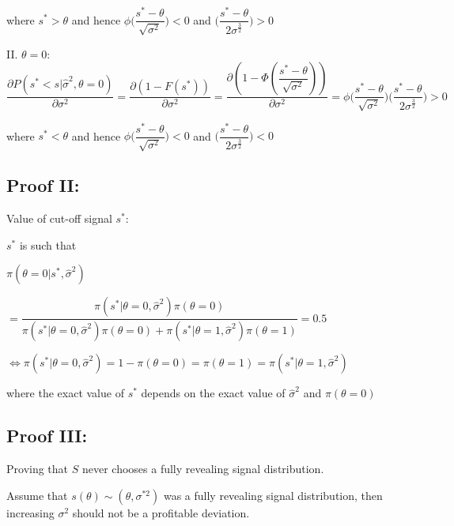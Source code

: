 \documentclass[paper=a4,12pt,DIV=11,twoside=false]{scrartcl}
\begin{document}
where $s^{*}>\theta$ and hence $\phi\Big(\dfrac{s^{*}-\theta}{\sqrt{\sigma^2}}\Big)<0$ and $\Big(\dfrac{s^{*}-\theta}{2\sigma^{\frac{3}{2}}}\Big)>0$

II. $\theta=0$:
\begin{equation}
\dfrac{\partial P(s^{*} < s|\hat{\sigma}^2,\theta=0)}{\partial \sigma^{2}} = \dfrac{\partial (1-F(s^{*}))}{\partial \sigma^2} = \dfrac{\partial (1-\Phi(\dfrac{s^{*}-\theta}{\sqrt{\sigma^2}}))}{\partial \sigma^2} = \phi\Big(\dfrac{s^{*}-\theta}{\sqrt{\sigma^2}}\Big)\Big(\dfrac{s^{*}-\theta}{2\sigma^{\frac{3}{2}}}\Big) > 0
\end{equation}

where $s^{*}<\theta$ and hence $\phi\Big(\dfrac{s^{*}-\theta}{\sqrt{\sigma^2}}\Big)<0$ and $\Big(\dfrac{s^{*}-\theta}{2\sigma^{\frac{3}{2}}}\Big)<0$

\subsection{Proof II:}

Value of cut-off signal $s^{*}$:

$s^{*}$ is such that 

\begin{center}
$\pi(\theta = 0|s^{*},\hat{\sigma}^2)$ 
\end{center}

\begin{center}
$= \dfrac{\pi(s^{*} | \theta = 0,\hat{\sigma}^2)\pi(\theta = 0)}{\pi(s^{*} | \theta = 0,\hat{\sigma}^2)\pi(\theta = 0) + \pi(s^{*} | \theta = 1,\hat{\sigma}^2)\pi(\theta = 1)} = 0.5$
\end{center}

\begin{center}
$\iff \pi(s^{*}|\theta = 0,\hat{\sigma}^2) = 1 - \pi(\theta = 0) = \pi(\theta = 1)=\pi(s^{*}|\theta = 1,\hat{\sigma}^2)$ 
\end{center}

where the exact value of $s^{*}$ depends on the exact value of $\hat{\sigma}^2$ and $\pi(\theta = 0)$

\subsection{Proof III:} Proving that $S$ never chooses a fully revealing signal distribution.

Assume that $s(\theta)\sim(\theta, \sigma^{*2})$ was a fully revealing signal distribution, then increasing $\sigma^{2}$ should not be a profitable deviation.
\end{document}
